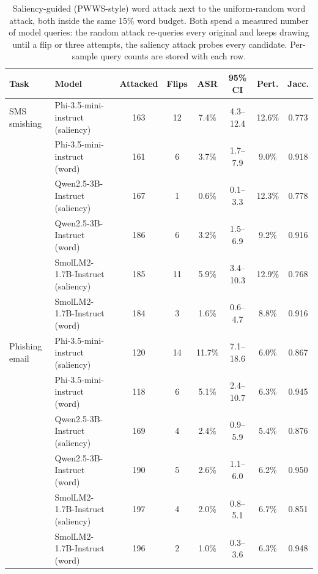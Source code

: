 \begin{table}[t]
\centering
\small
\caption{Saliency-guided (PWWS-style) word attack next to the uniform-random word attack, both inside the same 15\% word budget. Both spend a measured number of model queries: the random attack re-queries every original and keeps drawing until a flip or three attempts, the saliency attack probes every candidate. Per-sample query counts are stored with each row.}
\label{tab:saliency}
\begin{tabular}{llcccccc}
\toprule
\textbf{Task} & \textbf{Model} & \textbf{Attacked} & \textbf{Flips} & \textbf{ASR} & \textbf{95\% CI} & \textbf{Pert.} & \textbf{Jacc.} \\
\midrule
 SMS smishing & Phi-3.5-mini-instruct (saliency) & 163 & 12 & 7.4\% & 4.3--12.4 & 12.6\% & 0.773 \\
  & Phi-3.5-mini-instruct (word) & 161 & 6 & 3.7\% & 1.7--7.9 & 9.0\% & 0.918 \\
  & Qwen2.5-3B-Instruct (saliency) & 167 & 1 & 0.6\% & 0.1--3.3 & 12.3\% & 0.778 \\
  & Qwen2.5-3B-Instruct (word) & 186 & 6 & 3.2\% & 1.5--6.9 & 9.2\% & 0.916 \\
  & SmolLM2-1.7B-Instruct (saliency) & 185 & 11 & 5.9\% & 3.4--10.3 & 12.9\% & 0.768 \\
  & SmolLM2-1.7B-Instruct (word) & 184 & 3 & 1.6\% & 0.6--4.7 & 8.8\% & 0.916 \\
\midrule
 Phishing email & Phi-3.5-mini-instruct (saliency) & 120 & 14 & 11.7\% & 7.1--18.6 & 6.0\% & 0.867 \\
  & Phi-3.5-mini-instruct (word) & 118 & 6 & 5.1\% & 2.4--10.7 & 6.3\% & 0.945 \\
  & Qwen2.5-3B-Instruct (saliency) & 169 & 4 & 2.4\% & 0.9--5.9 & 5.4\% & 0.876 \\
  & Qwen2.5-3B-Instruct (word) & 190 & 5 & 2.6\% & 1.1--6.0 & 6.2\% & 0.950 \\
  & SmolLM2-1.7B-Instruct (saliency) & 197 & 4 & 2.0\% & 0.8--5.1 & 6.7\% & 0.851 \\
  & SmolLM2-1.7B-Instruct (word) & 196 & 2 & 1.0\% & 0.3--3.6 & 6.3\% & 0.948 \\
\bottomrule
\end{tabular}
\end{table}
